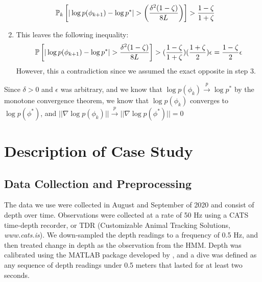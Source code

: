 \begin{enumerate}
\begin{align*}
        \mathbb{P}_k\left[|\log p(\phi_{k+1}) - \log p^*| >  \left(\frac{\delta^2(1-\zeta)}{8L}\right) \right] &> \frac{1-\zeta}{1+\zeta}
    \end{align*}
    \item This leaves the following inequality:
    \begin{equation}
        \mathbb{P}\left[|\log p(\phi_{k+1}) - \log p^*| > \frac{\delta^2(1-\zeta)}{8L} \right] > (\frac{1-\zeta}{1+\zeta})(\frac{1+\zeta}{2})\epsilon = \frac{1-\zeta}{2} \epsilon \label{eqn:eps_2}
    \end{equation}
    However, this a contradiction since we assumed the exact opposite in step 3.
\end{enumerate}

Since $\delta > 0$ and $\epsilon$ was arbitrary, and we know that $\log p(\phi_k) \overset{p}{\to} \log p^*$ by the monotone convergence theorem, we know that $\log p(\phi_k)$ converges to $\log p(\phi^*)$, and $||\nabla \log p(\phi_k)|| \overset{p}{\to}||\nabla \log p(\phi^*)|| = 0$

\section{Description of Case Study}

\subsection{Data Collection and Preprocessing}

The data we use were collected in August and September of 2020 and consist of depth over time. Observations were collected at a rate of 50 Hz using a CATS time-depth recorder, or TDR (Customizable Animal Tracking Solutions, {\em{www.cats.is}}). We down-sampled the depth readings to a frequency of 0.5 Hz, and then treated change in depth as the observation from the HMM. Depth was calibrated using the MATLAB package developed by \citet{Cade:2021}, and a dive was defined as any sequence of depth readings under 0.5 meters that lasted for at least two seconds. 


